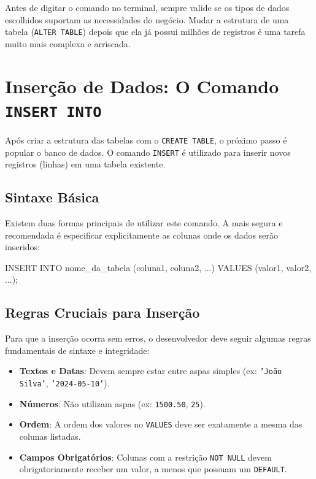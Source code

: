 \begin{tcolorbox}[colback=blue!5,colframe=blue!40!black,title=Dica do Professor: Planejamento]
Antes de digitar o comando no terminal, sempre valide se os tipos de dados escolhidos suportam as necessidades do negócio. Mudar a estrutura de uma tabela (\texttt{ALTER TABLE}) depois que ela já possui milhões de registros é uma tarefa muito mais complexa e arriscada.
\end{tcolorbox}


\section{Inserção de Dados: O Comando \texttt{INSERT INTO}}

Após criar a estrutura das tabelas com o \texttt{CREATE TABLE}, o próximo passo é popular o banco de dados. O comando \texttt{INSERT} é utilizado para inserir novos registros (linhas) em uma tabela existente.



\subsection{Sintaxe Básica}

Existem duas formas principais de utilizar este comando. A mais segura e recomendada é especificar explicitamente as colunas onde os dados serão inseridos:

\begin{sqlcode}
INSERT INTO nome_da_tabela (coluna1, coluna2, ...)
VALUES (valor1, valor2, ...);
\end{sqlcode}

\subsection{Regras Cruciais para Inserção}

Para que a inserção ocorra sem erros, o desenvolvedor deve seguir algumas regras fundamentais de sintaxe e integridade:

\begin{itemize}
    \item \textbf{Textos e Datas}: Devem sempre estar entre aspas simples (ex: \texttt{'João Silva'}, \texttt{'2024-05-10'}).
    \item \textbf{Números}: Não utilizam aspas (ex: \texttt{1500.50}, \texttt{25}).
    \item \textbf{Ordem}: A ordem dos valores no \texttt{VALUES} deve ser exatamente a mesma das colunas listadas.
    \item \textbf{Campos Obrigatórios}: Colunas com a restrição \texttt{NOT NULL} devem obrigatoriamente receber um valor, a menos que possuam um \texttt{DEFAULT}.
\end{itemize}

